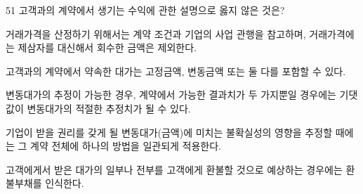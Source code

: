 \begin{question}{51}
고객과의 계약에서 생기는 수익에 관한 설명으로 옳지 않은 것은?
\begin{choices}
  \item 거래가격을 산정하기 위해서는 계약 조건과 기업의 사업 관행을 참고하며, 거래가격에는 제삼자를 대신해서 회수한 금액은 제외한다.
  \item 고객과의 계약에서 약속한 대가는 고정금액, 변동금액 또는 둘 다를 포함할 수 있다.
  \item 변동대가의 추정이 가능한 경우, 계약에서 가능한 결과치가 두 가지뿐일 경우에는 기댓값이 변동대가의 적절한 추정치가 될 수 있다.
  \item 기업이 받을 권리를 갖게 될 변동대가(금액)에 미치는 불확실성의 영향을 추정할 때에는 그 계약 전체에 하나의 방법을 일관되게 적용한다.
  \item 고객에게서 받은 대가의 일부나 전부를 고객에게 환불할 것으로 예상하는 경우에는 환불부채를 인식한다.
\end{choices}
\end{question}
